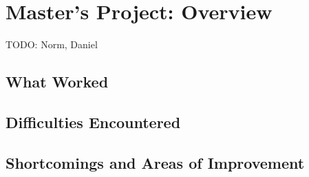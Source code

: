 \section{Master's Project: Overview}
TODO: Norm, Daniel
\subsection{What Worked}

\subsection{Difficulties Encountered}

\subsection{Shortcomings and Areas of Improvement}

\newpage